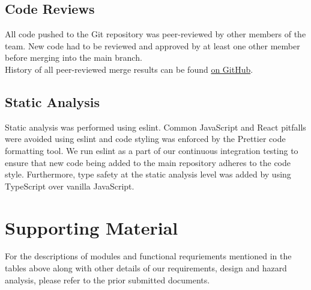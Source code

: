 \documentclass[fullpage]{article}
\begin{document}
\subsection{Code Reviews}

All code pushed to the Git repository was peer-reviewed by other members of the team. New code had to be reviewed and approved by at least one other member before merging into the main branch.\\
History of all peer-reviewed merge results can be found \href{https://github.com/calebmech/Book-Bazar/pulls?q=is\%3Apr+is\%3Amerged}{on GitHub}.

\subsection{Static Analysis}
Static analysis was performed using eslint. Common JavaScript and React pitfalls were avoided using eslint and code styling was enforced by the Prettier code formatting tool. We run eslint as a part of our continuous integration testing to ensure that new code being added to the main repository adheres to the code style. Furthermore, type safety at the static analysis level was added by using TypeScript over vanilla JavaScript.

\section{Supporting Material}
For the descriptions of modules and functional requriements mentioned in the tables above along with other details of our requirements, design and hazard analysis, please refer to the prior submitted documents.
\begin{comment}
\begin{thebibliography}{9}
\bibitem{website}
S. Liu, “Canada most popular desktop browsers 2021,” Statista, 04-Oct-2021. [Online]. Available: https://www.statista.com/statistics/499462/most-popular-desktop-browsers-in-canada-by-market-share/. [Accessed: 17-Oct-2021].
\end{thebibliography}
\end{comment}
\end{document}
